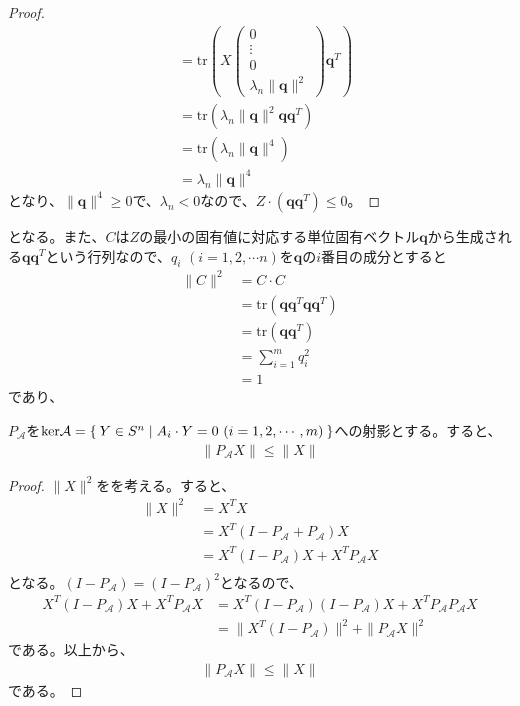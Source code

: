 \begin{proof}
\begin{align*}
                                      & = \mathrm{tr}\left(X \left(\begin{array}{c} 0 \\ \vdots \\ 0 \\ \lambda_n \|\mathbf{q}\|^2 \end{array}\right) \mathbf{q}^T\right) \\
                                      & = \mathrm{tr}\left(\lambda_n \|\mathbf{q}\|^2 \mathbf{q} \mathbf{q}^T\right) \\
                                      & = \mathrm{tr}\left(\lambda_n \|\mathbf{q}\|^4\right) \\
                                      & = \lambda_n \|\mathbf{q}\|^4
  \end{align*}
  となり、$\|\mathbf{q}\|^4 \geq 0$で、$\lambda_n < 0$なので、$Z \cdot (\mathbf{q} \mathbf{q}^T) \leq 0$。
\end{proof}
となる。また、$C$は$Z$の最小の固有値に対応する単位固有ベクトル$\mathbf{q}$から生成される$\mathbf{q} \mathbf{q}^T$という行列なので、$q_i \,\, (i = 1, 2, \cdots n)$を$\mathbf{q}$の$i$番目の成分とすると
\begin{align*}
  \|C\|^2 & = C \cdot C \\
          & = \mathrm{tr} \left(\mathbf{q} \mathbf{q}^T \mathbf{q} \mathbf{q}^T\right) \\
          & = \mathrm{tr} \left(\mathbf{q} \mathbf{q}^T\right) \\
          & = \displaystyle{\sum_{i = 1}^m q_i^2} \\
          & = 1
\end{align*}
であり、
\begin{lemma} \label{Shrink}
  $P_\mathcal{A}$を$\mathrm{ker} \mathcal{A} = \Set{Y \in S^n | A_i \cdot Y = 0 \,\, (i = 1, 2, \cdots, m)}$への射影とする。すると、
  \begin{align*}
    \|P_\mathcal{A} X\| \leq \|X\|
  \end{align*}
\end{lemma}
\begin{proof}
  $\|X\|^2$をを考える。すると、
  \begin{align*}
    \|X\|^2 & = X^T X \\
            & = X^T (I - P_\mathcal{A} + P_\mathcal{A}) X \\
            & = X^T (I - P_\mathcal{A}) X + X^T P_\mathcal{A} X \\
  \end{align*}
  となる。$(I - P_\mathcal{A}) = (I - P_\mathcal{A})^2$となるので、
  \begin{align*}
    X^T (I - P_\mathcal{A}) X + X^T P_\mathcal{A} X & = X^T (I - P_\mathcal{A}) (I - P_\mathcal{A}) X + X^T P_\mathcal{A} P_\mathcal{A} X\\
                                                    & = \|X^T (I - P_\mathcal{A})\|^2 + \|P_\mathcal{A} X\|^2
  \end{align*}
  である。以上から、
  \begin{align*}
    \|P_\mathcal{A} X\| \leq \|X\|
  \end{align*}
  である。
\end{proof}
